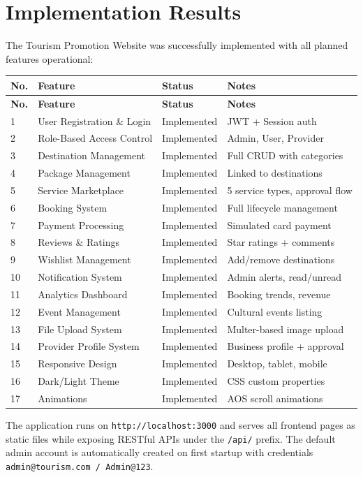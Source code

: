 \section{Implementation Results}

The Tourism Promotion Website was successfully implemented with all planned features operational:

\begin{longtable}{|p{0.5cm}|p{5cm}|p{3cm}|p{3.5cm}|}
\hline
\textbf{No.} & \textbf{Feature} & \textbf{Status} & \textbf{Notes} \\
\hline
\endfirsthead
\hline
\textbf{No.} & \textbf{Feature} & \textbf{Status} & \textbf{Notes} \\
\hline
\endhead
1 & User Registration \& Login & Implemented & JWT + Session auth \\
\hline
2 & Role-Based Access Control & Implemented & Admin, User, Provider \\
\hline
3 & Destination Management & Implemented & Full CRUD with categories \\
\hline
4 & Package Management & Implemented & Linked to destinations \\
\hline
5 & Service Marketplace & Implemented & 5 service types, approval flow \\
\hline
6 & Booking System & Implemented & Full lifecycle management \\
\hline
7 & Payment Processing & Implemented & Simulated card payment \\
\hline
8 & Reviews \& Ratings & Implemented & Star ratings + comments \\
\hline
9 & Wishlist Management & Implemented & Add/remove destinations \\
\hline
10 & Notification System & Implemented & Admin alerts, read/unread \\
\hline
11 & Analytics Dashboard & Implemented & Booking trends, revenue \\
\hline
12 & Event Management & Implemented & Cultural events listing \\
\hline
13 & File Upload System & Implemented & Multer-based image upload \\
\hline
14 & Provider Profile System & Implemented & Business profile + approval \\
\hline
15 & Responsive Design & Implemented & Desktop, tablet, mobile \\
\hline
16 & Dark/Light Theme & Implemented & CSS custom properties \\
\hline
17 & Animations & Implemented & AOS scroll animations \\
\hline
\end{longtable}

The application runs on \texttt{http://localhost:3000} and serves all frontend pages as static files while exposing RESTful APIs under the \texttt{/api/} prefix. The default admin account is automatically created on first startup with credentials \texttt{admin@tourism.com / Admin@123}.
